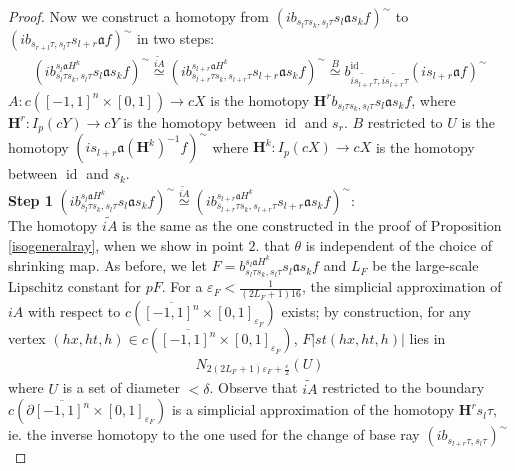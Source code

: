 \documentclass[a4paper,11pt]{article}
\theoremstyle{definition}
\theoremstyle{plain}
\theoremstyle{remark}
\DeclareMathOperator{\id}{id}
\begin{document}
{\begin{proof}
Now we construct a homotopy from  $(i b_{s_{l}\tau s_{k},s_{l}\tau} s_{l}\mathfrak{a} s_{k} f)^{\sim}$ to $(ib_{s_{r+l}\tau,s_{l}\tau}s_{l+r}\mathfrak{a}f)^{\sim}$ in two steps:
\begin{align*}
(i b^{s_{l}\mathfrak{a}H^{k}}_{s_{l}\tau s_{k},s_{l}\tau} s_{l}\mathfrak{a} s_{k} f)^{\sim} \overset{\widetilde{iA}}{\simeq} (i b^{s_{l+r}\mathfrak{a}H^{k}}_{s_{l+r}\tau s_{k},s_{l+r}\tau} s_{l+r}\mathfrak{a} s_{k} f)^{\sim} \overset{B}{\simeq} b^{\id}_{\widetilde{is_{l+r}\tau},\widetilde{is_{l+r}\tau}}(i s_{l+r}\mathfrak{a}f)^{\sim}
\end{align*}
$A: c([-1,1]^{n} \times [0,1])\rightarrow cX$ is the homotopy $\mathbf{H}^{r} b_{s_{l}\tau s_{k},s_{l}\tau} s_{l}\mathfrak{a}s_{k}f$, where $\mathbf{H}^{r}: I_{p}(cY)\rightarrow cY$ is the homotopy between $\id$ and $s_{r}$. $B$ restricted to $U$ is the homotopy $(is_{l+r}\mathfrak{a} (\mathbf{H}^{k})^{-1}f)^{\sim}$ where $\mathbf{H}^{k}:I_{p}(cX)\rightarrow cX$ is the homotopy between $\id$ and $s_{k}$. \\

\textbf{Step 1} $(i b^{s_{l}\mathfrak{a}H^{k}}_{s_{l}\tau s_{k},s_{l}\tau} s_{l}\mathfrak{a} s_{k} f)^{\sim} \overset{\widetilde{iA}}{\simeq} (i b^{s_{l+r}\mathfrak{a}H^{k}}_{s_{l+r}\tau s_{k},s_{l+r}\tau} s_{l+r}\mathfrak{a} s_{k} f)^{\sim}$: \\

The homotopy $\widetilde{iA}$ is the same as the one constructed in the proof of Proposition \ref{isogeneralray}, when we show in point $2.$ that $\theta$ is independent of the choice of shrinking map. As before, we let $F= b^{s_{l}\mathfrak{a}H^{k}}_{s_{l}\tau s_{k},s_{l}\tau} s_{l}\mathfrak{a} s_{k} f$ and $L_{F}$ be the large-scale Lipschitz constant for $pF$. For a $\varepsilon_{F}<\frac{1}{(2L_{F}+1)16}$, the simplicial approximation of $iA$ with respect to $c(\overline{[-1,1]^n} \times [0,1]_{\varepsilon_{F}})$ exists; by construction, for any vertex $(hx,ht,h)\in c(\overline{[-1,1]^n} \times [0,1]_{\varepsilon_{F}})$, $F|st(hx,ht,h)|$ lies in 
\begin{align*}
N_{2(2L_{F}+1)\varepsilon_{F} +\frac{\varepsilon}{2}} (U)
\end{align*} 
where $U$ is a set of diameter $<\delta$. Observe that $\widetilde{iA}$ restricted to the boundary $c(\partial\overline{[-1,1]^n} \times [0,1]_{\varepsilon_{F}})$ is a simplicial approximation of the homotopy $\mathbf{H}^{r} s_{l}\tau$, ie. the inverse homotopy to the one used for the change of base ray $(ib_{s_{l+r}\tau,s_{l}\tau})^{\sim}$\\


\end{proof}}
\end{document}
